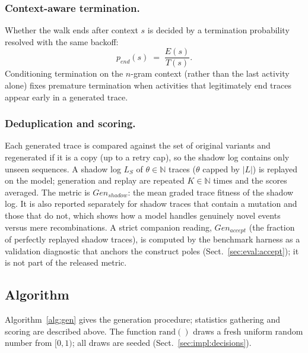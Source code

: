 \documentclass[runningheads]{llncs}
\newcommand{\genshadow}{\ensuremath{\mathit{Gen}_{\mathit{shadow}}}}
\newcommand{\genaccept}{\ensuremath{\mathit{Gen}_{\mathit{accept}}}}
\newcommand{\pend}{\ensuremath{p_{\mathit{end}}}}
\newcommand{\shlog}{\ensuremath{L_S}}
\begin{document}
\subsubsection{Context-aware termination.}
Whether the walk ends after context $s$ is decided by a termination probability resolved with the same backoff:
\begin{equation}
\pend(s) \;=\; \frac{E(s)}{T(s)}.
\end{equation}
Conditioning termination on the $n$-gram context (rather than the last activity alone) fixes premature termination when activities that legitimately end traces appear early in a generated trace.

\subsubsection{Deduplication and scoring.}
Each generated trace is compared against the set of original variants and regenerated if it is a copy (up to a retry cap), so the shadow log contains only unseen sequences. A shadow log $\shlog$ of $\theta\in\mathbb{N}$ traces ($\theta$ capped by $|L|$) is replayed on the model; generation and replay are repeated $K\in\mathbb{N}$ times and the scores averaged. The metric is \genshadow{}: the mean graded trace fitness of the shadow log. It is also reported separately for shadow traces that contain a mutation and those that do not, which shows how a model handles genuinely novel events versus mere recombinations. A strict companion reading, \genaccept{} (the fraction of perfectly replayed shadow traces), is computed by the benchmark harness as a validation diagnostic that anchors the construct poles (Sect.~\ref{sec:eval:accept}); it is not part of the released metric.

\subsection{Algorithm}
\label{sec:method:algo}
Algorithm~\ref{alg:gen} gives the generation procedure; statistics gathering and scoring are described above. The function $\mathrm{rand}()$ draws a fresh uniform random number from $[0,1)$; all draws are seeded (Sect.~\ref{sec:impl:decisions}).
\end{document}
